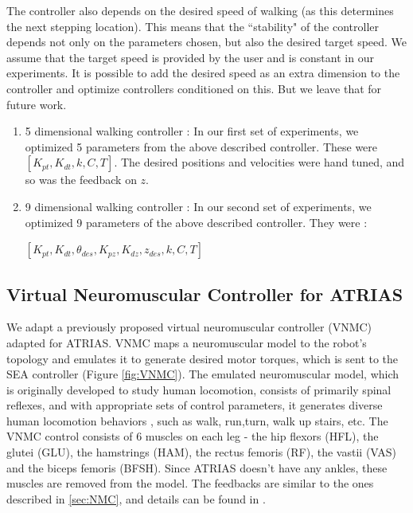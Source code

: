 The controller also depends on the desired speed of walking (as this determines the next stepping location). This means that the ``stability" of the controller depends not only on the parameters chosen, but also the desired target speed. We assume that the target speed is provided by the user and is constant in our experiments. It is possible to add the desired speed as an extra dimension to the controller and optimize controllers conditioned on this. But we leave that for future work.

\begin{enumerate}
    \item 5 dimensional walking controller : In our first set of experiments, we optimized 5 parameters from the above described controller. These were $[K_{pt}, K_{dt}, k, C, T]$. The desired positions and velocities were hand tuned, and so was the feedback on $z$.
    \item 9 dimensional walking controller : In our second set of experiments, we optimized 9 parameters of the above described controller. They were :
    
    $[K_{pt}, K_{dt}, \theta_{des}, K_{pz}, K_{dz}, z_{des}, k, C, T]$
\end{enumerate}

\subsection{Virtual Neuromuscular Controller for ATRIAS}
\label{sec:VNMC_cont}

We adapt a previously proposed virtual neuromuscular controller (VNMC) \cite{batts2015toward} adapted for ATRIAS. VNMC maps a neuromuscular model to the robot's topology and emulates it to generate desired motor torques, which is sent to the SEA controller (Figure \ref{fig:VNMC}).
The emulated neuromuscular model, which is originally developed to study human locomotion, consists of primarily spinal reflexes, and with appropriate sets of control parameters, it generates diverse human locomotion behaviors \cite{song2015neural}, such as walk, run,turn, walk up stairs, etc. The VNMC control consists of 6 muscles on each leg - the hip flexors (HFL), the glutei (GLU), the hamstrings (HAM), the rectus femoris (RF), the vastii (VAS) and the biceps femoris (BFSH). Since ATRIAS doesn't have any ankles, these muscles are removed from the model. The feedbacks are similar to the ones described in \ref{sec:NMC}, and details can be found in \cite{song2015neural}.

